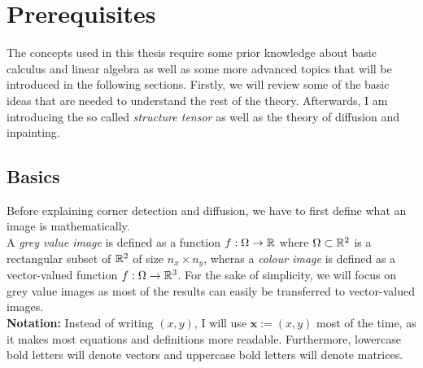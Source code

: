 \chapter{Prerequisites}\label{ch:Theory}
The concepts used in this thesis require some prior knowledge about basic calculus and linear
algebra as well as some more advanced topics that will be introduced in the following sections.
Firstly, we will review some of the basic ideas that are needed to understand the rest of the
theory.
Afterwards, I am introducing the so called \textit{structure tensor} as well as the 
theory of diffusion and inpainting.
\section{Basics}\label{sec:Basics}
Before explaining corner detection and diffusion, we have to first define what an image is
mathematically.\\
A \textit{grey value image} is defined as a function $f: \Omega \rightarrow \mathbb{R}$ where
$\Omega \subset \mathbb{R}^2$ is a rectangular subset of $\mathbb{R}^2$ of size $n_x\times n_y$,
wheras a
\textit{colour image} is defined as a vector-valued function $f: \Omega \rightarrow \mathbb{R}^3$.
For the sake of simplicity, we will focus on grey value images as most of the results can easily be
transferred to vector-valued images.\\
\textbf{Notation:} Instead of writing $(x, y)$, I will use $\boldsymbol x := (x, y)$ most of the
time, as it makes most equations and definitions more readable. Furthermore, lowercase bold letters will denote vectors and uppercase bold letters will
denote matrices.
